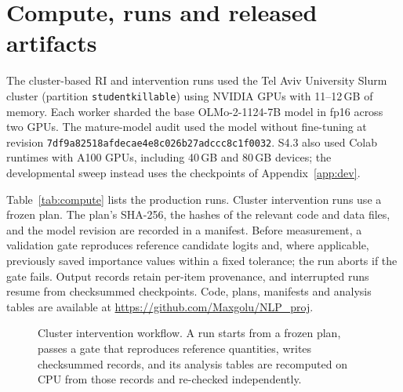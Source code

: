 \section{Compute, runs and released artifacts}
\label{app:compute}

The cluster-based RI and intervention runs used the Tel Aviv University Slurm cluster
(partition \texttt{studentkillable}) using NVIDIA GPUs with 11--12\,GB of
memory. Each worker sharded the base OLMo-2-1124-7B model in fp16 across two
GPUs. The mature-model audit used the model without fine-tuning at revision
\texttt{7df9a82518afdecae4e8c026b27adccc8c1f0032}.
S4.3 also used Colab runtimes with A100 GPUs, including 40\,GB and 80\,GB devices;
the developmental sweep instead uses the checkpoints of Appendix~\ref{app:dev}.

Table~\ref{tab:compute} lists the production runs. Cluster intervention runs use a
frozen plan. The plan's SHA-256, the hashes of the relevant code and data files,
and the model revision are recorded in a manifest. Before measurement, a
validation gate reproduces reference candidate logits and, where applicable,
previously saved importance values within a fixed tolerance; the run aborts if
the gate fails. Output records retain per-item provenance, and interrupted runs
resume from checksummed checkpoints. Code, plans, manifests and analysis tables
are available at \url{https://github.com/Maxgolu/NLP_proj}.

\begin{figure}[h]
\centering
{}
\caption{Cluster intervention workflow. A run starts from a frozen plan, passes a
gate that reproduces reference quantities, writes checksummed records, and its
analysis tables are recomputed on CPU from those records and re-checked
independently.}
\label{fig:pipeline}
\end{figure}


